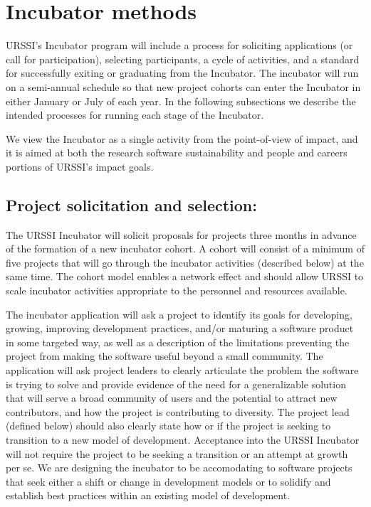 \documentclass[
]{book}
\begin{document}
\hypertarget{incubator-methods}{%
\section{Incubator methods}\label{incubator-methods}}

URSSI's Incubator program will include a process for soliciting applications (or call for participation), selecting participants, a cycle of activities, and a standard for successfully exiting or graduating from the Incubator.
The incubator will run on a semi-annual schedule so that new project cohorts can enter the Incubator in either January or July of each year.
In the following subsections we describe the intended processes for running each stage of the Incubator.

We view the Incubator as a single activity from the point-of-view of impact, and it is aimed at both the research software sustainability and people and careers portions of URSSI's impact goals.

\hypertarget{project-solicitation-and-selection}{%
\subsection{Project solicitation and selection:}\label{project-solicitation-and-selection}}

The URSSI Incubator will solicit proposals for projects three months in advance of the formation of a new incubator cohort.
A cohort will consist of a minimum of five projects that will go through the incubator activities (described below) at the same time.
The cohort model enables a network effect and should allow URSSI to scale incubator activities appropriate to the personnel and resources available.

The incubator application will ask a project to identify its goals for developing, growing, improving development practices, and/or maturing a software product in some targeted way, as well as a description of the limitations preventing the project from making the software useful beyond a small community.
The application will ask project leaders to clearly articulate the problem the software is trying to solve and provide evidence of the need for a generalizable solution that will serve a broad community of users and the potential to attract new contributors, and how the project is contributing to diversity.
The project lead (defined below) should also clearly state how or if the project is seeking to transition to a new model of development.
Acceptance into the URSSI Incubator will not require the project to be seeking a transition or an attempt at growth per se.
We are designing the incubator to be accomodating to software projects that seek either a shift or change in development models or to solidify and establish best practices within an existing model of development.
\end{document}
